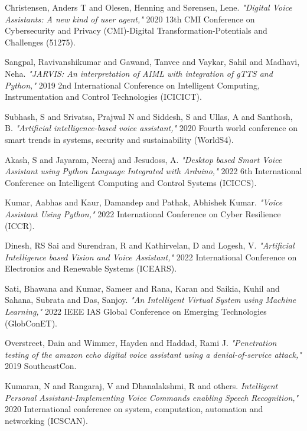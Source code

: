 \documentclass[conference]{IEEEtran}
\begin{document}
\begin{thebibliography}{20}

Christensen, Anders T and Olesen, Henning and S{\o}rensen, Lene. \emph{"Digital Voice Assistants: A new kind of user agent,"} 2020 13th CMI Conference on Cybersecurity and Privacy (CMI)-Digital Transformation-Potentials and Challenges (51275).

Sangpal, Ravivanshikumar and Gawand, Tanvee and Vaykar, Sahil and Madhavi, Neha.  \emph{"JARVIS: An interpretation of AIML with integration of gTTS and Python,"} 2019 2nd International Conference on Intelligent Computing, Instrumentation and Control Technologies (ICICICT).

Subhash, S and Srivatsa, Prajwal N and Siddesh, S and Ullas, A and Santhosh, B. \emph{"Artificial intelligence-based voice assistant,"} 2020 Fourth world conference on smart trends in systems, security and sustainability (WorldS4).

Akash, S and Jayaram, Neeraj and Jesudoss, A. \emph{"Desktop based Smart Voice Assistant using Python Language Integrated with Arduino,"} 2022 6th International Conference on Intelligent Computing and Control Systems (ICICCS).

Kumar, Aabhas and Kaur, Damandep and Pathak, Abhishek Kumar. \emph{"Voice Assistant Using Python,"} 2022 International Conference on Cyber Resilience (ICCR).

Dinesh, RS Sai and Surendran, R and Kathirvelan, D and Logesh, V. \emph{"Artificial Intelligence based Vision and Voice Assistant,"} 2022 International Conference on Electronics and Renewable Systems (ICEARS).

Sati, Bhawana and Kumar, Sameer and Rana, Karan and Saikia, Kuhil and Sahana, Subrata and Das, Sanjoy. \emph{"An Intelligent Virtual System using Machine Learning,"} 2022 IEEE IAS Global Conference on Emerging Technologies (GlobConET).

Overstreet, Dain and Wimmer, Hayden and Haddad, Rami J. \emph{"Penetration testing of the amazon echo digital voice assistant using a denial-of-service attack,"} 2019 SoutheastCon.

Kumaran, N and Rangaraj, V and Dhanalakshmi, R and others. \emph{Intelligent Personal Assistant-Implementing Voice Commands enabling Speech Recognition,"} 2020 International conference on system, computation, automation and networking (ICSCAN).


\end{thebibliography}
\end{document}
